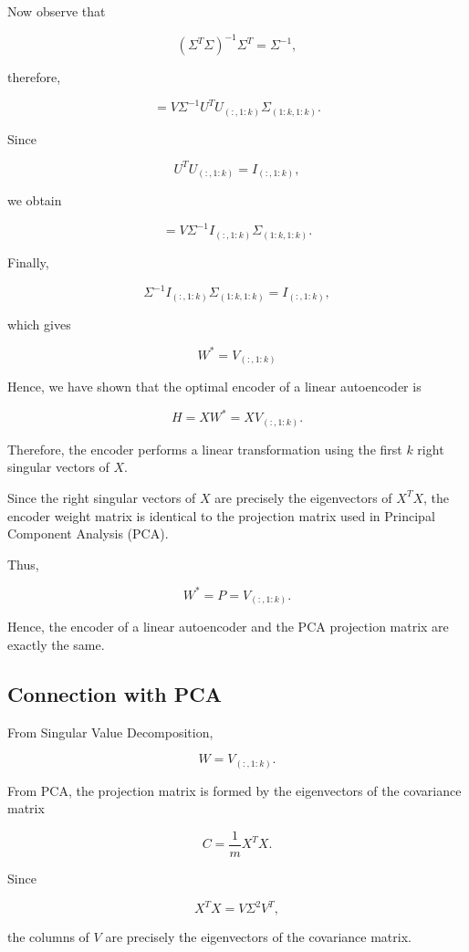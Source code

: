 \documentclass{article}
\begin{document}
Now observe that

\[
(\Sigma^{T}\Sigma)^{-1}\Sigma^{T}
=
\Sigma^{-1},
\]

therefore,

\[
=
V
\Sigma^{-1}
U^{T}
U_{(:,1:k)}
\Sigma_{(1:k,1:k)}.
\]

Since

\[
U^{T}U_{(:,1:k)}
=
I_{(:,1:k)},
\]

we obtain

\[
=
V
\Sigma^{-1}
I_{(:,1:k)}
\Sigma_{(1:k,1:k)}.
\]

Finally,

\[
\Sigma^{-1}
I_{(:,1:k)}
\Sigma_{(1:k,1:k)}
=
I_{(:,1:k)},
\]

which gives

\[
\boxed{
	W^{*}
	=
	V_{(:,1:k)}
}
\]

Hence, we have shown that the optimal encoder of a linear
autoencoder is

\[
\boxed{
	H=XW^{*}
	=
	XV_{(:,1:k)}.
}
\]

Therefore, the encoder performs a linear transformation using the first
\(k\) right singular vectors of \(X\).

Since the right singular vectors of \(X\) are precisely the eigenvectors
of \(X^{T}X\), the encoder weight matrix is identical to the projection
matrix used in Principal Component Analysis (PCA).

Thus,

\[
\boxed{
	W^{*}=P=V_{(:,1:k)}.
}
\]

Hence, the encoder of a linear autoencoder and the PCA projection matrix
are exactly the same.
\subsection{Connection with PCA}

From Singular Value Decomposition,

\[
\boxed{
	W
	=
	V_{(:,1:k)}.
}
\]

From PCA, the projection matrix is formed by the eigenvectors of the covariance
matrix

\[
C
=
\frac{1}{m}X^{T}X.
\]

Since

\[
X^{T}X
=
V\Sigma^{2}V^{T},
\]

the columns of $V$ are precisely the eigenvectors of the covariance matrix.
\end{document}

